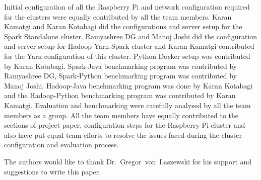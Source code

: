 Initial configuration of all the Raspberry Pi and network configuration 
required for the clusters were equally contributed by all the team members.
Karan Kamatgi and Karan Kotabagi did the configurations and server setup for the
Spark Standalone cluster. Ramyashree DG and Manoj Joshi did the configuration 
and server setup for Hadoop-Yarn-Spark cluster and Karan Kamatgi contributed for
the Yarn configuration of this cluster. Python Docker setup was contributed by 
Karan Kotabagi. Spark-Java benchmarking program was contributed by Ramyashree DG,
Spark-Python benchmarking program was contributed by Manoj Joshi. Hadoop-Java 
benchmarking program was done by Karan Kotabagi and the Hadoop-Python 
benchmarking program was contributed by Karan Kamatgi. Evaluation and 
benchmarking were carefully analysed by all the team members as a group. All the 
team members have equally contributed to the sections of project paper, 
configuration steps for the Raspberry Pi cluster and also have put equal team 
efforts to resolve the issues faced during the cluster configuration and 
evaluation process.







\begin{acks}

  The authors would like to thank Dr.~Gregor~von~Laszewski 
  for his support and suggestions to write this paper.
  
\end{acks}


